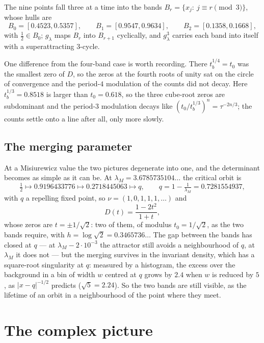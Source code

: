 \documentclass[11pt]{article}
\theoremstyle{plain}
\theoremstyle{definition}
\begin{document}
The nine points fall three at a time into the bands $B_r=\{x_j:\ j\equiv r\pmod3\}$, whose
hulls are
\[
  B_0=[0.4523,0.5357],\qquad B_1=[0.9547,0.9634],\qquad B_2=[0.1358,0.1668],
\]
with $\tfrac12\in B_0$; $g_\lambda$ maps $B_r$ into $B_{r+1}$ cyclically, and $g_\lambda^3$
carries each band into itself with a superattracting $3$-cycle.

One difference from the four-band case is worth recording.  There $t_b^{1/4}=t_0$ was the
smallest zero of $D$, so the zeros at the fourth roots of unity sat on the circle of
convergence and the period-$4$ modulation of the counts did not decay.  Here $t_b^{1/3}=0.8518$
is larger than $t_0=0.618$, so the three cube-root zeros are subdominant and the period-$3$
modulation decays like $(t_0/t_b^{1/3})^n=\tau^{-2n/3}$; the counts settle onto a line after
all, only more slowly.

\subsection{The merging parameter}\label{sec:bandsmerge}

At a Misiurewicz value the two pictures degenerate into one, and the determinant becomes as
simple as it can be.  At $\lambda_M=3.6785735104\ldots$ the critical orbit is
\[
  \tfrac12\longmapsto0.9196433776\longmapsto0.2718445063\longmapsto q,
  \qquad q=1-\tfrac1{\lambda_M}=0.7281554937,
\]
with $q$ a repelling fixed point, so $\nu=(1,0,1,1,1,\ldots)$ and
\begin{equation}\label{eq:merging}
  D(t)=\frac{1-2t^2}{1+t},
\end{equation}
whose zeros are $t=\pm1/\sqrt2$: two of them, of modulus
$t_0=1/\sqrt2$, as the two bands require, with $h=\log\sqrt2=0.3465736\ldots$  The gap between
the bands has closed at $q$ --- at $\lambda_M-2\cdot10^{-3}$ the attractor still avoids a
neighbourhood of $q$, at $\lambda_M$ it does not --- but the merging survives in the invariant
density, which has a square-root singularity at $q$: measured by a histogram, the excess over
the background in a bin of width $w$ centred at $q$ grows by $2.4$ when $w$ is reduced by $5$,
as $|x-q|^{-1/2}$ predicts ($\sqrt5=2.24$).  So the two bands are still visible, as the
lifetime of an orbit in a neighbourhood of the point where they meet.

\section{The complex picture}\label{sec:julia}
\end{document}
